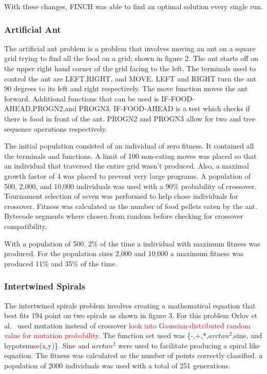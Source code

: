 \documentclass{sig-alternate}
\newcommand{\mycomment}[1]{\textcolor{red}{#1}}
\begin{document}
	With these changes, FINCH was able to find an optimal solution every single run.
	
\subsubsection{Artificial Ant}
	The artificial ant problem is a problem that involves moving an ant on a square grid trying to find all the food on a grid; shown in figure 2. The ant starts off on the upper right hand corner of the grid facing to the left. The terminals used to control the ant are LEFT,RIGHT, and MOVE. LEFT and RIGHT turn the ant 90 degrees to its left and right respectively. The move function moves the ant forward. Additional functions that can be used is IF-FOOD-AHEAD,PROGN2,and PROGN3. IF-FOOD-AHEAD is a test which checks if there is food in front of the ant. PROGN2 and PROGN3 allow for two and tree sequence operations respectively.
	
	The initial population consisted of an individual of zero fitness. It contained all the terminals and functions. A limit of 100 non-eating moves was placed so that an individual that traversed the entire grid wasn't produced. Also, a maximal growth factor of 4 was placed to prevent very large programs. A population of 500, 2,000, and 10,000 individuals was used with a 90\% probability of crossover. Tournament selection of seven was performed to help chose individuals for crossover. Fitness was calculated as the number of food pellets eaten by the ant. Bytecode segments where chosen from random before checking for crossover compatibility.
	
	With a population of 500, 2\% of the time a individual with maximum fitness was produced. For the population sizes 2,000 and 10,000 a maximum fitness was produced 11\% and 35\% of the time. 

\subsubsection{Intertwined Spirals}
The intertwined spirals problem involves creating a mathematical equation that best fits 194 point on two spirals as shown in figure 3. For this problem Orlov et al.~\cite{FINCH:2011} used mutation instead of crossover \mycomment{look into Gaussian-distributed random value for mutation probability}. The function set used was \{-,+,*,$arctan^2$,sine, and hypotenuse(x,y)\}. Sine and $arctan^2$ were used to facilitate producing a spiral like equation. The fitness was calculated as the number of points correctly classified. a population of 2000 individuals was used with a total of 251 generations. 
\end{document}
